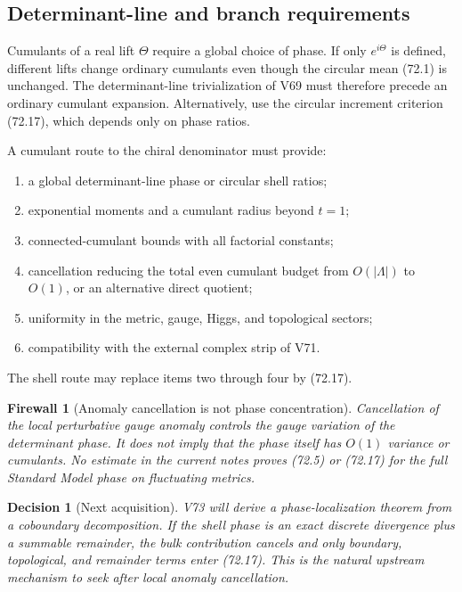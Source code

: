 \documentclass[11pt]{article}
\newtheorem{firewall}[theorem]{Firewall}
\newtheorem{decision}[theorem]{Decision}
\begin{document}
\subsection{Determinant-line and branch requirements}

Cumulants of a real lift \(\Theta\) require a global choice of phase.
If only \(e^{i\Theta}\) is defined, different lifts change ordinary
cumulants even though the circular mean (72.1) is unchanged.  The
determinant-line trivialization of V69 must therefore precede an
ordinary cumulant expansion.  Alternatively, use the circular
increment criterion (72.17), which depends only on phase ratios.

\begin{ledger}
\label{led:v11v72-data}
A cumulant route to the chiral denominator must provide:
\begin{enumerate}
\item a global determinant-line phase or circular shell ratios;
\item exponential moments and a cumulant radius beyond \(t=1\);
\item connected-cumulant bounds with all factorial constants;
\item cancellation reducing the total even cumulant budget from
\(O(|\Lambda|)\) to \(O(1)\), or an alternative direct quotient;
\item uniformity in the metric, gauge, Higgs, and topological sectors;
\item compatibility with the external complex strip of V71.
\end{enumerate}
The shell route may replace items two through four by (72.17).
\end{ledger}

\begin{firewall}[Anomaly cancellation is not phase concentration]
\label{fire:v11v72-boundary}
Cancellation of the local perturbative gauge anomaly controls the
gauge variation of the determinant phase.  It does not imply that the
phase itself has \(O(1)\) variance or cumulants.  No estimate in the
current notes proves (72.5) or (72.17) for the full Standard Model
phase on fluctuating metrics.
\end{firewall}

\begin{decision}[Next acquisition]
\label{dec:v11v72-next}
V73 will derive a phase-localization theorem from a coboundary
decomposition.  If the shell phase is an exact discrete divergence plus
a summable remainder, the bulk contribution cancels and only boundary,
topological, and remainder terms enter (72.17).  This is the natural
upstream mechanism to seek after local anomaly cancellation.
\end{decision}
\end{document}
